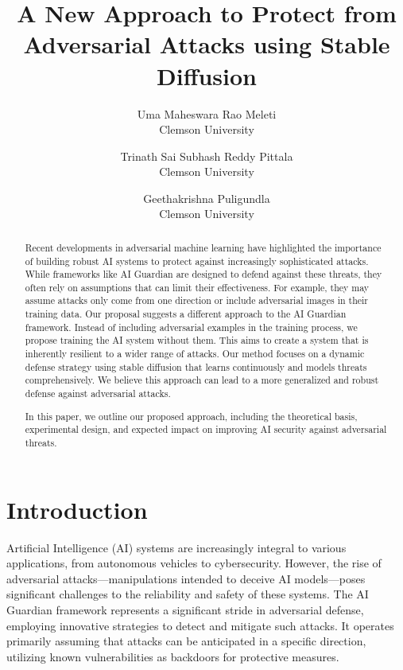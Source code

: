 \documentclass[letterpaper,twocolumn,10pt]{article}
\begin{document}

\date{}
\title{\Large \bf A New Approach to Protect from Adversarial Attacks using Stable Diffusion}

\author{
{\rm Uma Maheswara Rao Meleti}\\
Clemson University
\and
{\rm Trinath Sai Subhash Reddy Pittala}\\
Clemson University
\and
{\rm Geethakrishna Puligundla}\\
Clemson University
}

\maketitle
\begin{abstract}
Recent developments in adversarial machine learning have highlighted the importance of building robust AI systems to protect against increasingly sophisticated attacks. While frameworks like AI Guardian are designed to defend against these threats, they often rely on assumptions that can limit their effectiveness. For example, they may assume attacks only come from one direction or include adversarial images in their training data. Our proposal suggests a different approach to the AI Guardian framework. Instead of including adversarial examples in the training process, we propose training the AI system without them. This aims to create a system that is inherently resilient to a wider range of attacks. Our method focuses on a dynamic defense strategy using stable diffusion that learns continuously and models threats comprehensively. We believe this approach can lead to a more generalized and robust defense against adversarial attacks.

In this paper, we outline our proposed approach, including the theoretical basis, experimental design, and expected impact on improving AI security against adversarial threats.
\end{abstract}

\section{Introduction}

Artificial Intelligence (AI) systems are increasingly integral to various applications, from autonomous vehicles to cybersecurity. However, the rise of adversarial attacks—manipulations intended to deceive AI models—poses significant challenges to the reliability and safety of these systems. The AI Guardian framework represents a significant stride in adversarial defense, employing innovative strategies to detect and mitigate such attacks. It operates primarily assuming that attacks can be anticipated in a specific direction, utilizing known vulnerabilities as backdoors for protective measures.
\end{document}
